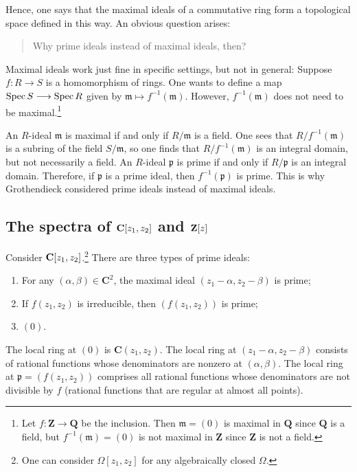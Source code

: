 \documentclass [11 pt, oneside] {article}
\begin{document}
Hence, one says that the maximal ideals of a commutative ring form a topological space defined in this way. An obvious question arises:
\begin{quote}
	\small 
	Why prime ideals instead of maximal ideals, then?
\end{quote}
Maximal ideals work just fine in specific settings, but not in general: Suppose $f:R\longrightarrow S$ is a homomorphism of rings. One wants to define a map $\operatorname{Spec} S \longrightarrow \operatorname{Spec} R$ given by $\mathfrak{m} \longmapsto f^{-1}(\mathfrak{m})$. However, $f^{-1}(\mathfrak{m})$ does not need to be maximal.\footnote{Let $f:\mathbf{Z} \longrightarrow \mathbf{Q}$ be the inclusion. Then $\mathfrak{m}=(0)$ is maximal in $\mathbf{Q}$ since $\mathbf{Q}$ is a field, but $f^{-1}(\mathfrak{m}) = (0)$ is not maximal in $\mathbf{Z}$ since $\mathbf{Z}$ is not a field.}

An $R$-ideal $\mathfrak{m}$ is maximal if and only if $R/\mathfrak{m}$ is a field. One sees that $R/f^{-1}(\mathfrak{m})$ is a subring of the field $S/\mathfrak{m}$, so one finds that $R/f^{-1}(\mathfrak{m})$ is an integral domain, but not necessarily a field. An $R$-ideal $\mathfrak{p}$ is prime if and only if $R/\mathfrak{p}$ is an integral domain. Therefore, if $\mathfrak{p}$ is a prime ideal, then $f^{-1}(\mathfrak{p})$ is prime. This is why Grothendieck considered prime ideals instead of maximal ideals.

\subsection{The spectra of \texorpdfstring{$\mathbf C[z_1,z_2]$}{C[z1,z2]} and \texorpdfstring{$\mathbf Z[z]$}{Z[z]}}
Consider $\mathbf C[z_1,z_2]$.\footnote{One can consider $\Omega[z_1,z_2]$ for any algebraically closed $\Omega$.} There are three types of prime ideals:
\begin{enumerate}
	\item For any $(\alpha,\beta)\in  \mathbf{C}^2$, the maximal ideal $(z_1-\alpha,z_2-\beta)$ is prime;
	\item If $f(z_1,z_2)$ is irreducible, then $(f(z_1,z_2))$ is prime; 
	\item $(0)$.
\end{enumerate}
The local ring at $(0)$ is $\mathbf{C}(z_1,z_2)$. The local ring at $(z_1-\alpha, z_2-\beta)$ consists of rational functions whose denominators are nonzero at $(\alpha,\beta)$. The local ring at $\mathfrak{p} = (f(z_1,z_2))$ comprises all rational functions whose denominators are not divisible by $f$ (rational functions that are regular at almost all points).
\end{document}
